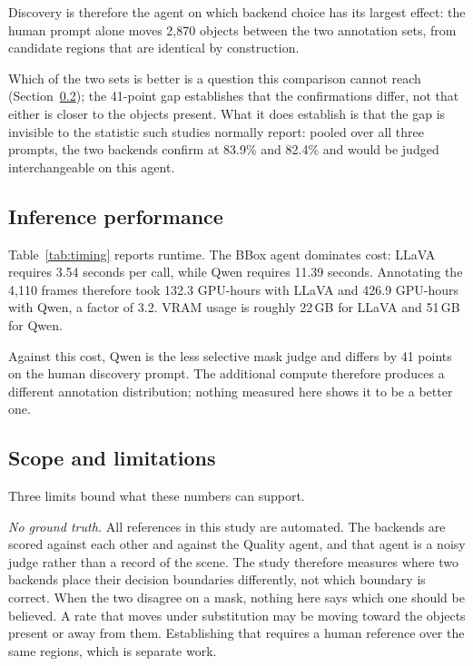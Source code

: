 \documentclass[a4paper,twoside]{article}
\begin{document}
Discovery is therefore the agent on which backend choice has its largest effect: the human prompt alone moves 2{,}870 objects between the two annotation sets, from candidate regions that are identical by construction.

Which of the two sets is better is a question this comparison cannot reach (Section~\ref{sec:scope}); the 41-point gap establishes that the confirmations differ, not that either is closer to the objects present. What it does establish is that the gap is invisible to the statistic such studies normally report: pooled over all three prompts, the two backends confirm at 83.9\% and 82.4\% and would be judged interchangeable on this agent.


\subsection{Inference performance}



Table~\ref{tab:timing} reports runtime.  
The BBox agent dominates cost: LLaVA requires 3.54 seconds per call, while Qwen requires 11.39 seconds.  
Annotating the 4{,}110 frames therefore took 132.3 GPU-hours with LLaVA and 426.9 GPU-hours with Qwen, a factor of 3.2.  
VRAM usage is roughly 22\,GB for LLaVA and 51\,GB for Qwen.

Against this cost, Qwen is the less selective mask judge and differs by 41 points on the human discovery prompt.
The additional compute therefore produces a different annotation distribution; nothing measured here shows it to be a better one.

\subsection{Scope and limitations}
\label{sec:scope}

Three limits bound what these numbers can support.

\emph{No ground truth.}  
All references in this study are automated.  
The backends are scored against each other and against the Quality agent, and that agent is a noisy judge rather than a record of the scene.  
The study therefore measures where two backends place their decision boundaries differently, not which boundary is correct.  
When the two disagree on a mask, nothing here says which one should be believed.  
A rate that moves under substitution may be moving toward the objects present or away from them.  
Establishing that requires a human reference over the same regions, which is separate work.
\end{document}
